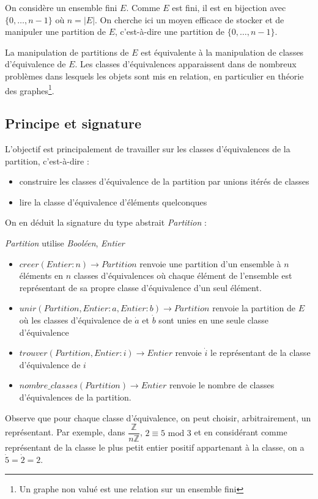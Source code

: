 \documentclass[../../../main.tex]{subfiles}
\begin{document}
On considère un ensemble fini $E$. Comme $E$ est fini, il est en bijection avec $\{0, \dots, n - 1\}$ où $n = |E|$. On cherche ici un moyen efficace de stocker et de manipuler une partition de $E$, c'est-à-dire une partition de $\{0, \dots, n-1\}$.

La manipulation de partitions de $E$ est équivalente à la manipulation de classes d'équivalence de $E$. Les classes d'équivalences apparaissent dans de nombreux problèmes dans lesquels les objets sont mis en relation, en particulier en théorie des graphes\footnote{Un graphe non valué est une relation sur un ensemble fini}.
\subsection{Principe et signature}
\label{sub:partition_principe_et_signature}
L'objectif est principalement de travailler sur les classes d'équivalences de la partition, c'est-à-dire :
\begin{itemize}
	\item construire les classes d'équivalence de la partition par unions itérés de classes
	\item lire la classe d'équivalence d'éléments quelconques
\end{itemize}
On en déduit la signature du type abstrait \textit{Partition} :

\textit{Partition} utilise \textit{Booléen}, \textit{Entier}
\begin{itemize}
	\item $creer(Entier:n)\rightarrow Partition$ renvoie une partition d'un ensemble à $n$ éléments en $n$ classes d'équivalences où chaque élément de l'ensemble est représentant de sa propre classe d'équivalence d'un seul élément.
	\item $unir(Partition, Entier:a, Entier:b)\rightarrow Partition$ renvoie la partition de $E$ où les classes d'équivalence de $\dot{a}$ et $\dot{b}$ sont unies en une seule classe d'équivalence
	\item $trouver(Partition, Entier:i)\rightarrow Entier$ renvoie $\dot{i}$ le représentant de la classe d'équivalence de $i$
	\item $nombre\_classes(Partition)\rightarrow Entier$ renvoie le nombre de classes d'équivalences de la partition.
\end{itemize}
Observe que pour chaque classe d'équivalence, on peut choisir, arbitrairement, un représentant. Par exemple, dans $\dfrac{\mathbb{Z}}{n\mathbb{Z}}$, $2\equiv 5\text{ mod }3$ et en considérant comme représentant de la classe le plus petit entier positif appartenant à la classe, on a $\dot{5} = \dot{2} = 2$.
\end{document}
